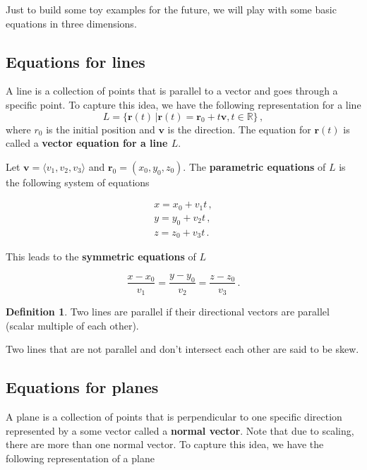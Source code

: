 \documentclass[
]{article}
\theoremstyle{definition}
\newtheorem{definition}{Definition}[section]
\theoremstyle{definition}
\theoremstyle{definition}
\theoremstyle{definition}
\theoremstyle{remark}
\begin{document}
Just to build some toy examples for the future, we will play with some basic
equations in three dimensions.

\hypertarget{equations-for-lines}{%
\subsection{Equations for lines}\label{equations-for-lines}}

A line is a collection of points that is parallel to a vector and goes through a
specific point.
To capture this idea, we have the following representation for a line
\begin{equation*}
    L = \{\mathbf{r}(t) \,|  \mathbf{r}(t) = \mathbf{r}_0 + t \mathbf{v}, t\in \mathbb{R}\}  \,,
\end{equation*}
where \({r}_0\) is the initial position and \(\mathbf{v}\) is the direction.
The equation for \(\mathbf{r}(t)\) is called a \textbf{vector equation for a line \(L\)}.

Let \(\mathbf{v} = \langle v_1, v_2, v_3 \rangle\) and \(\mathbf{r}_0 = ( x_0, y_0, z_0 )\).
The \textbf{parametric equations} of \(L\) is the following system of equations

\begin{gather*}
    x = x_0 + v_1 t\,, \\
    y = y_0 + v_2 t\,, \\
    z = z_0 + v_3 t \,. 
\end{gather*}

This leads to the \textbf{symmetric equations} of \(L\)

\begin{equation*}
    \frac{x - x_0}{v_1} = \frac{y - y_0}{v_2} = \frac{z - z_0}{v_3} \,.
\end{equation*}

\begin{definition}
Two lines are parallel if their directional vectors are parallel (scalar multiple of each other).

Two lines that are not parallel and don't intersect each other are said to be skew.
\end{definition}

\hypertarget{equations-for-planes}{%
\subsection{Equations for planes}\label{equations-for-planes}}

A plane is a collection of points that is perpendicular to one specific direction
represented by a some vector called a \textbf{normal vector}.
Note that due to scaling, there are more than one normal vector.
To capture this idea, we have the following representation of a plane
\end{document}
